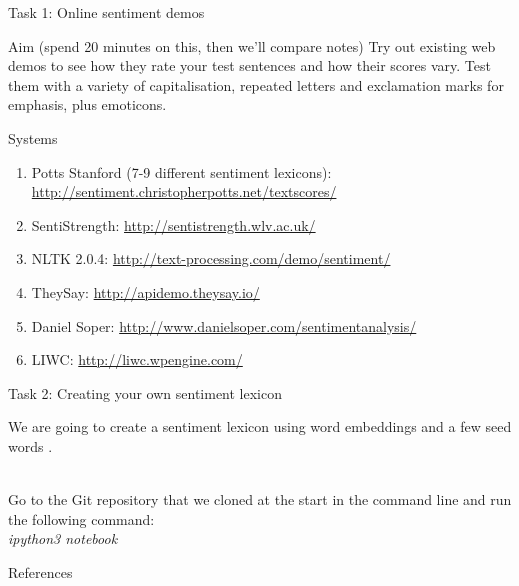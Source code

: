 \documentclass[10pt]{beamer}
\begin{document}
\begin{frame}{Task 1: Online sentiment demos}
  \begin{block}{Aim (spend 20 minutes on this, then we'll compare notes)}
  Try out existing web demos to see how they rate your test sentences and how their scores vary. Test them with a variety of capitalisation, repeated letters and exclamation marks for emphasis, plus emoticons. \cite{TehEtAl2016}
  \end{block}
  \begin{block}{Systems}
    \begin{enumerate}
    \item Potts Stanford (7-9 different sentiment lexicons): \url{http://sentiment.christopherpotts.net/textscores/}
    \item SentiStrength: \url{http://sentistrength.wlv.ac.uk/}
    \item NLTK 2.0.4: \url{http://text-processing.com/demo/sentiment/}
    \item TheySay: \url{http://apidemo.theysay.io/}
    \item Daniel Soper: \url{http://www.danielsoper.com/sentimentanalysis/}
    \item LIWC: \url{http://liwc.wpengine.com/}
    \end{enumerate}
  \end{block}

\end{frame}

\begin{frame}{Task 2: Creating your own sentiment lexicon}

We are going to create a sentiment lexicon using word embeddings and a few seed words \cite{Hamilton16}.
\\
~

Go to the Git repository that we cloned at the start in the command line and run the following command:\\
\textit{ipython3 notebook}
\end{frame}

\begin{frame}[allowframebreaks]{References}
  
  

\end{frame}
\end{document}
